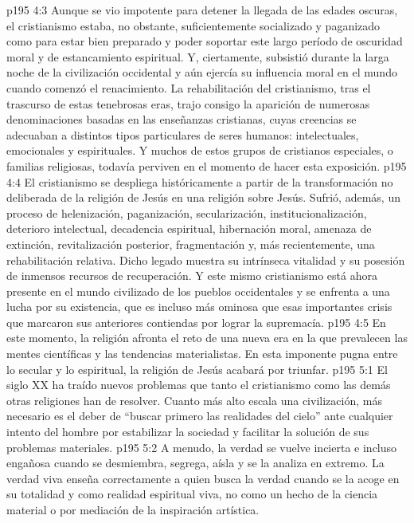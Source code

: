 \vs p195 4:3 Aunque se vio impotente para detener la llegada de las edades oscuras, el cristianismo estaba, no obstante, suficientemente socializado y paganizado como para estar bien preparado y poder soportar este largo período de oscuridad moral y de estancamiento espiritual. Y, ciertamente, subsistió durante la larga noche de la civilización occidental y aún ejercía su influencia moral en el mundo cuando comenzó el renacimiento. La rehabilitación del cristianismo, tras el trascurso de estas tenebrosas eras, trajo consigo la aparición de numerosas denominaciones basadas en las enseñanzas cristianas, cuyas creencias se adecuaban a distintos tipos particulares de seres humanos: intelectuales, emocionales y espirituales. Y muchos de estos grupos de cristianos especiales, o familias religiosas, todavía perviven en el momento de hacer esta exposición.
\vs p195 4:4 \pc El cristianismo se despliega históricamente a partir de la transformación no deliberada de la religión de Jesús en una religión sobre Jesús. Sufrió, además, un proceso de helenización, paganización, secularización, institucionalización, deterioro intelectual, decadencia espiritual, hibernación moral, amenaza de extinción, revitalización posterior, fragmentación y, más recientemente, una rehabilitación relativa. Dicho legado muestra su intrínseca vitalidad y su posesión de inmensos recursos de recuperación. Y este mismo cristianismo está ahora presente en el mundo civilizado de los pueblos occidentales y se enfrenta a una lucha por su existencia, que es incluso más ominosa que esas importantes crisis que marcaron sus anteriores contiendas por lograr la supremacía.
\vs p195 4:5 \pc En este momento, la religión afronta el reto de una nueva era en la que prevalecen las mentes científicas y las tendencias materialistas. En esta imponente pugna entre lo secular y lo espiritual, la religión de Jesús acabará por triunfar.
\vs p195 5:1 El siglo XX ha traído nuevos problemas que tanto el cristianismo como las demás otras religiones han de resolver. Cuanto más alto escala una civilización, más necesario es el deber de “buscar primero las realidades del cielo” ante cualquier intento del hombre por estabilizar la sociedad y facilitar la solución de sus problemas materiales.
\vs p195 5:2 A menudo, la verdad se vuelve incierta e incluso engañosa cuando se desmiembra, segrega, aísla y se la analiza en extremo. La verdad viva enseña correctamente a quien busca la verdad cuando se la acoge en su totalidad y como realidad espiritual viva, no como un hecho de la ciencia material o por mediación de la inspiración artística.
